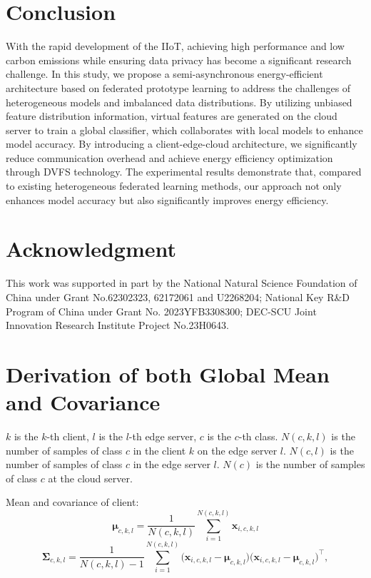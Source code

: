 \documentclass[journal]{IEEEtran}
\begin{document}
\section{Conclusion}
With the rapid development of the IIoT, achieving high performance and low carbon emissions while ensuring data privacy has become a significant research challenge. In this study, we propose a semi-asynchronous energy-efficient architecture based on federated prototype learning to address the challenges of heterogeneous models and imbalanced data distributions. By utilizing unbiased feature distribution information, virtual features are generated on the cloud server to train a global classifier, which collaborates with local models to enhance model accuracy. By introducing a client-edge-cloud architecture, we significantly reduce communication overhead and achieve energy efficiency optimization through DVFS technology. The experimental results demonstrate that, compared to existing heterogeneous federated learning methods, our approach not only enhances model accuracy but also significantly improves energy efficiency.



\section*{Acknowledgment}

This work was supported in part by the National Natural Science Foundation of China under Grant No.62302323, 62172061 and U2268204; National Key R\&D Program of China under Grant No. 2023YFB3308300; DEC-SCU Joint Innovation Research Institute Project No.23H0643.
 



\appendices
\onecolumn

\section{Derivation of both Global Mean and Covariance}
\(k\) is the \(k\)-th client, \(l\) is the \(l\)-th edge server, \(c\) is the \(c\)-th class. \( N(c,k,l) \) is the number of samples of class \( c \) in the client \( k \) on the edge server \( l \). \( N(c,l) \) is the number of samples of class \( c \) in the edge server \( l \). \( N(c) \) is the number of samples of class \( c \) at the cloud server.

Mean and covariance of client:
\begin{equation}
\mathbf{\mu}_{c,k,l} = \frac{1}{N(c,k,l)} \sum_{i=1}^{N(c,k,l)} \mathbf{x}_{i,c,k,l}
\end{equation}
\begin{equation}
\mathbf{\Sigma}_{c,k,l} = \frac{1}{N(c,k,l)-1} \sum_{i=1}^{N(c,k,l)} \big( \mathbf{x}_{i,c,k,l} - \mathbf{\mu}_{c,k,l} \big) \big( \mathbf{x}_{i,c,k,l} - \mathbf{\mu}_{c,k,l} \big)^\top,
\end{equation}
\end{document}
